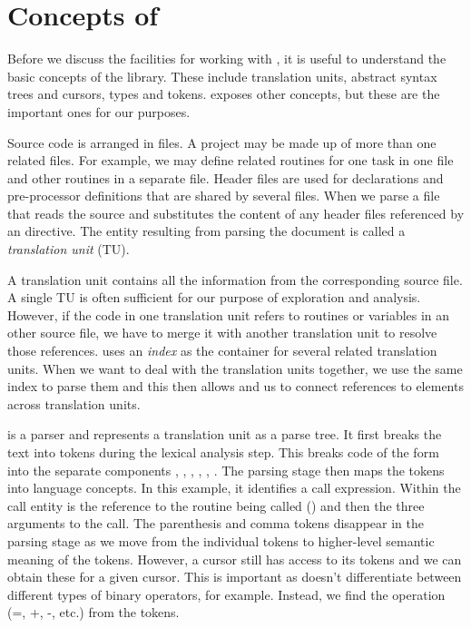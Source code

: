 \section[Concepts of libclang]{Concepts of \libclang}\label{sec:libclangConcepts}

Before we discuss the \R{} facilities for working with \libclang, it
is useful to understand the basic concepts of the library.  These
include translation units, abstract syntax trees and cursors, types
and tokens.  \libclang{} exposes other concepts, but these are the
important ones for our purposes.

Source code is arranged in files. A project may be made up of more
than one related files.  For example, we may define related routines
for one task in one file and other routines in a separate file.
Header files are used for declarations and pre-processor definitions
that are shared by several files.  When we parse a file that reads the
source and substitutes the content of any header files referenced by
an  directive.  The entity resulting from parsing
the document is called a \textit{translation unit} (TU).

A translation unit contains all the information from the corresponding
source file.  A single TU is often sufficient for our purpose of
exploration and analysis. However, if the code in one translation unit
refers to routines or variables in an other source file, we have to
merge it with another translation unit to resolve those references.
\libclang{} uses an \textit{index} as the container for several
related translation units.  When we want to deal with the translation
units together, we use the same index to parse them and this then
allows \libclang{} and us to connect references to elements across
translation units.

\libclang{} is a parser and represents a translation unit as a parse
tree.  It first breaks the text into tokens during the lexical
analysis step.  This breaks code of the form 
into the separate components , \dquote{(}, ,
, , \dquote{)}.  The parsing stage then maps the
tokens into language concepts.  In this example, it identifies a call
expression. Within the call entity is the reference to the routine
being called () and then the three arguments to the call.
The parenthesis and comma tokens disappear in the parsing stage as we
move from the individual tokens to higher-level semantic meaning of
the tokens.  However, a cursor still has access to its tokens and we
can obtain these for a given cursor. This is important as \libclang{}
doesn't differentiate between different types of binary operators, for
example. Instead, we find the operation (=, +, -, etc.) from the
tokens.

